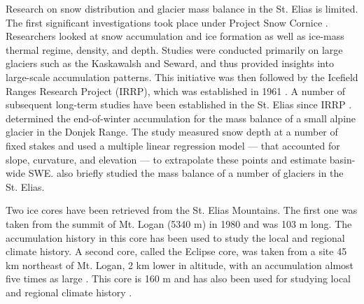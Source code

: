 \documentclass{sfuthesis}
\begin{document}
Research on snow distribution and glacier mass balance in the St. Elias is limited. The first significant investigations took place under Project Snow Cornice \citep{Wood1948}. Researchers looked at snow accumulation and ice formation as well as ice-mass thermal regime, density, and depth. Studies were conducted primarily on large glaciers such as the Kaskawalsh and Seward, and thus provided insights into large-scale accumulation patterns. This initiative was then followed by the Icefield Ranges Research Project (IRRP), which was established in 1961 \citep{Danby2003}. A number of subsequent long-term studies have been established in the St. Elias since IRRP \citep[e.g.][]{Clarke1984, Paoli2009}. \cite{Wheler2014} determined the end-of-winter accumulation for the mass balance of a small alpine glacier in the Donjek Range. The study measured snow depth at a number of fixed stakes and used a multiple linear regression model --- that accounted for slope, curvature, and elevation --- to extrapolate these points and estimate basin-wide SWE. \cite{Arendt2008} also briefly studied the mass balance of a number of glaciers in the St. Elias.

Two ice cores have been retrieved from the St. Elias Mountains. The first one was taken from the summit of Mt. Logan (5340 m) in 1980 and was 103 m long. The accumulation history in this core has been used to study the local \citep{Holdsworth1991} and regional \citep{Moore2002} climate history. A second core, called the Eclipse core, was taken from a site 45 km northeast of Mt. Logan, 2 km lower in altitude, with an accumulation almost five times as large \citep{Wake2002}. This core is 160 m and has also been used for studying local and regional climate history \citep{Wake2002}. 
\end{document}
